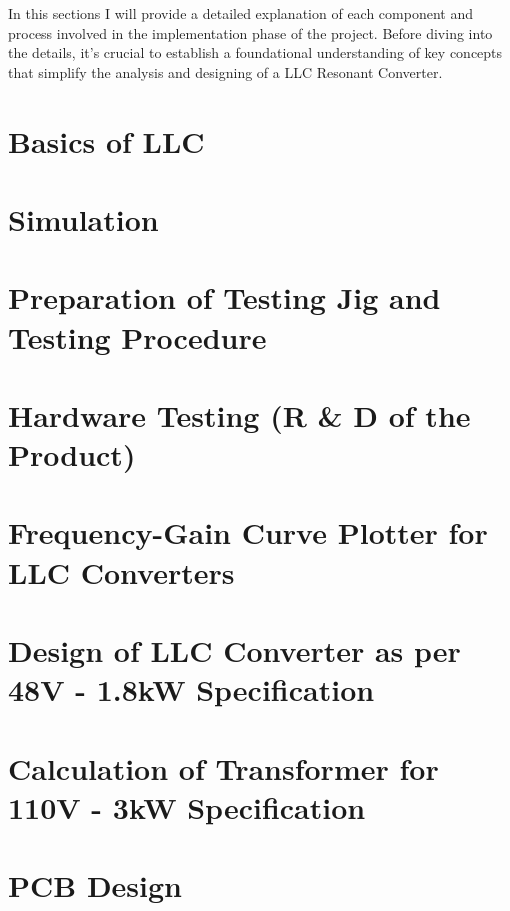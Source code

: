 In this sections I will provide a detailed explanation of each component and
process involved in the implementation phase of the project. Before diving into
the details, it's crucial to establish a foundational understanding of key
concepts that simplify the analysis and designing of a LLC Resonant Converter.
\section{Basics of LLC}

\section{Simulation}

\section{Preparation of Testing Jig and Testing Procedure}

\section{Hardware Testing (R \& D of the Product)}

\section{Frequency-Gain Curve Plotter for LLC Converters}

\section{Design of LLC Converter as per 48V - 1.8kW Specification}

\section{Calculation of Transformer for 110V - 3kW Specification}

\section{PCB Design}

